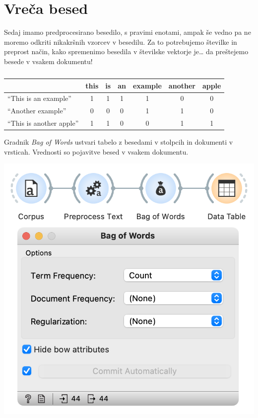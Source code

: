 \chapter{Vreča besed}
\label{ch:vreca-besed}

Sedaj imamo predprocesirano besedilo, s pravimi enotami, ampak še vedno pa ne moremo odkriti nikakršnih vzorcev v besedilu. Za to potrebujemo številke in preprost način, kako spremenimo besedila v številske vektorje je… da preštejemo besede v vsakem dokumentu!

\begin{table}
    \centering
    \begin{tabular}{ l c c c c c c }
        \hline
         &this&is&an&example&another&apple\\
         \hline
        ``This is an example'' & 1 & 1 & 1 & 1 & 0 & 0 \\ 
        ``Another example'' & 0 & 0 & 0 & 1 & 1 & 0 \\
        ``This is another apple'' & 1 & 1 & 0 & 0 & 1 & 1\\
        \hline
    \end{tabular}
    \caption{ }
\end{table}

Gradnik \textit{Bag of Words} ustvari tabelo z besedami v stolpcih in dokumenti v vrsticah. Vrednosti so pojavitve besed v vsakem dokumentu.

\begin{marginfigure}[4cm]
    \includegraphics[width=\linewidth]{vreca-besed-workflow.png}
    \caption{}
\end{marginfigure}

